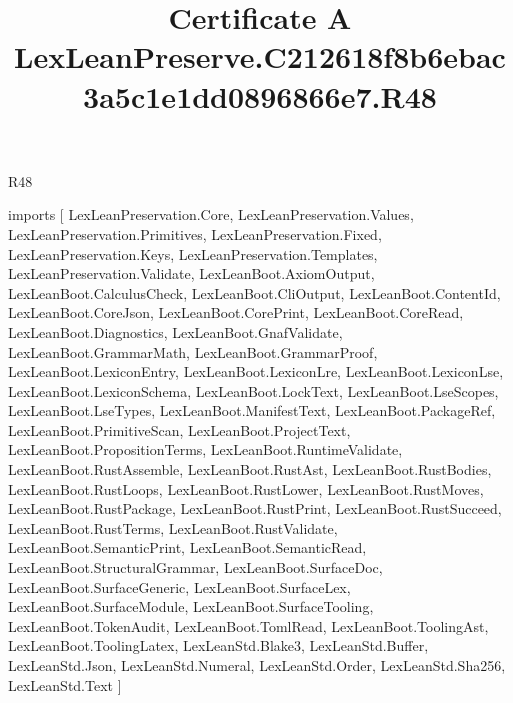 \begin{lexlean}{R48}
\title{Certificate A LexLeanPreserve.C212618f8b6ebac3a5c1e1dd0896866e7.R48}
\begin{coremodule}
imports [
  LexLeanPreservation.Core,
  LexLeanPreservation.Values,
  LexLeanPreservation.Primitives,
  LexLeanPreservation.Fixed,
  LexLeanPreservation.Keys,
  LexLeanPreservation.Templates,
  LexLeanPreservation.Validate,
  LexLeanBoot.AxiomOutput,
  LexLeanBoot.CalculusCheck,
  LexLeanBoot.CliOutput,
  LexLeanBoot.ContentId,
  LexLeanBoot.CoreJson,
  LexLeanBoot.CorePrint,
  LexLeanBoot.CoreRead,
  LexLeanBoot.Diagnostics,
  LexLeanBoot.GnafValidate,
  LexLeanBoot.GrammarMath,
  LexLeanBoot.GrammarProof,
  LexLeanBoot.LexiconEntry,
  LexLeanBoot.LexiconLre,
  LexLeanBoot.LexiconLse,
  LexLeanBoot.LexiconSchema,
  LexLeanBoot.LockText,
  LexLeanBoot.LseScopes,
  LexLeanBoot.LseTypes,
  LexLeanBoot.ManifestText,
  LexLeanBoot.PackageRef,
  LexLeanBoot.PrimitiveScan,
  LexLeanBoot.ProjectText,
  LexLeanBoot.PropositionTerms,
  LexLeanBoot.RuntimeValidate,
  LexLeanBoot.RustAssemble,
  LexLeanBoot.RustAst,
  LexLeanBoot.RustBodies,
  LexLeanBoot.RustLoops,
  LexLeanBoot.RustLower,
  LexLeanBoot.RustMoves,
  LexLeanBoot.RustPackage,
  LexLeanBoot.RustPrint,
  LexLeanBoot.RustSucceed,
  LexLeanBoot.RustTerms,
  LexLeanBoot.RustValidate,
  LexLeanBoot.SemanticPrint,
  LexLeanBoot.SemanticRead,
  LexLeanBoot.StructuralGrammar,
  LexLeanBoot.SurfaceDoc,
  LexLeanBoot.SurfaceGeneric,
  LexLeanBoot.SurfaceLex,
  LexLeanBoot.SurfaceModule,
  LexLeanBoot.SurfaceTooling,
  LexLeanBoot.TokenAudit,
  LexLeanBoot.TomlRead,
  LexLeanBoot.ToolingAst,
  LexLeanBoot.ToolingLatex,
  LexLeanStd.Blake3,
  LexLeanStd.Buffer,
  LexLeanStd.Json,
  LexLeanStd.Numeral,
  LexLeanStd.Order,
  LexLeanStd.Sha256,
  LexLeanStd.Text
]


\end{coremodule}
\end{lexlean}
